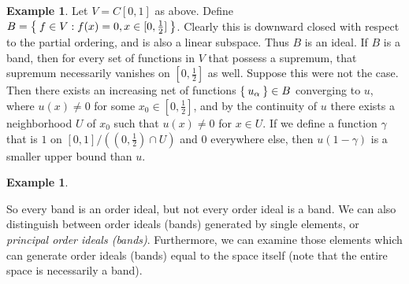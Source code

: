 \documentclass[letterpaper,10pt,oneside,onecolumn,reqno]{amsart}
\theoremstyle{definition}
\newtheorem{exa}[thm]{Example}
\begin{document}
\begin{framed}
\begin{exa}
  Let $V=C[0,1]$ as above. Define $B = \Set{f \in V : f(x) = 0, x \in
    [0, \frac{1}{2}]}$. Clearly this is downward closed with respect
  to the partial ordering, and is also a linear subspace. Thus $B$ is
  an ideal. If $B$ is a band, then for every set of functions in $V$
  that possess a supremum, that supremum necessarily vanishes on
  $[0,\frac{1}{2}]$ as well. Suppose this were not the case. Then
  there exists an increasing net of functions $\Set{u_{\alpha}} \in B$
  converging to $u$, where $u(x) \neq 0 $ for some $x_0 \in
  [0,\frac{1}{2}]$, and by the continuity of $u$ there exists a
  neighborhood $U$ of $x_0$ such that $u(x) \neq 0$ for $x \in U$. If
  we define a function $\gamma$ that is $1$ on $[0,1]/((0,\frac{1}{2})
  \cap U)$ and $0$ everywhere else, then $u(1 - \gamma)$ is a smaller
  upper bound than $u$. 

\end{exa}

\end{framed}

\begin{exa}

\end{exa}

So every band is an order ideal, but not every order ideal is a
band. We can also distinguish between order ideals (bands) generated
by single elements, or \emph{principal order ideals
  (bands)}. Furthermore, we can examine those elements which can
generate order ideals (bands) equal to the space itself (note that the
entire space is necessarily a band).
\end{document}
